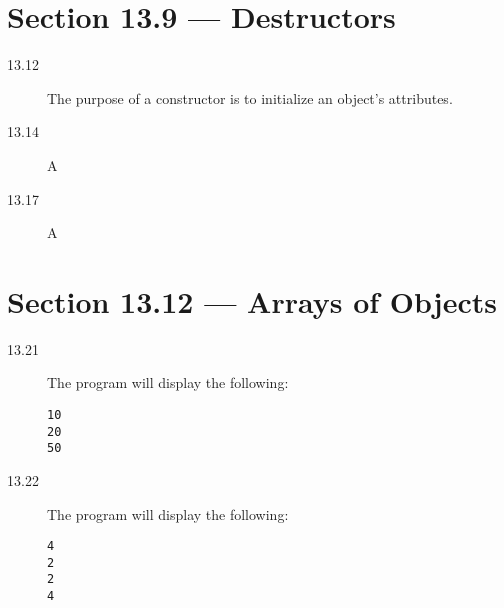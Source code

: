 \documentclass[11pt]{article}
\begin{document}
\section*{Section 13.9 --- Destructors}
\begin{description}
    \item[13.12] The purpose of a constructor is to initialize an object's attributes.
    \item[13.14] A
    \item[13.17] A
\end{description}

\section*{Section 13.12 --- Arrays of Objects}
\begin{description}
    \item[13.21] The program will display the following:
\begin{verbatim}
10
20
50
\end{verbatim}
    \item[13.22] The program will display the following:
\begin{verbatim}
4
2
2
4
\end{verbatim}
\end{description}
\end{document}
